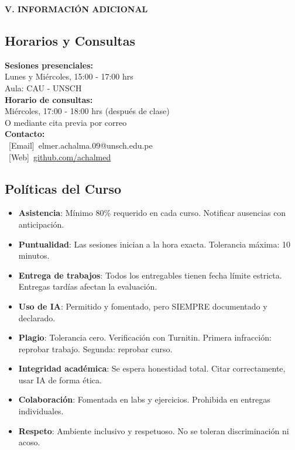 \documentclass[12pt,a4paper]{yaac-luatex}
\newcommand{\faInfoCircle}{\textbullet}
\newcommand{\faEnvelope}{[Email]}
\newcommand{\faGlobe}{[Web]}
\newcommand{\secciontitulo}[1]{
	\vspace{0.5cm}
	\begin{tcolorbox}[
		enhanced,
		colback=maincolor,
		colframe=maincolor,
		arc=3pt,
		boxrule=0pt,
		left=8pt,
		right=8pt,
		top=6pt,
		bottom=6pt
		]
		{\color{white}\large\bfseries #1}
	\end{tcolorbox}
}
\newcommand{\icontext}[2]{
	\mbox{%
		\textcolor{maincolor}{#1}\hspace{0.3em}%
		{#2}%
	}%
}
\begin{document}
	\secciontitulo{\faInfoCircle \hspace{0.3em} V. INFORMACIÓN ADICIONAL}
	
	\subsection*{Horarios y Consultas}
	
	\begin{tcolorbox}[
		enhanced,
		colback=lightgray,
		colframe=maincolor,
		arc=3pt,
		boxrule=1pt
		]
		\textbf{Sesiones presenciales:}\\
		Lunes y Miércoles, 15:00 - 17:00 hrs\\
		Aula: CAU - UNSCH\\[0.3cm]
		
		\textbf{Horario de consultas:}\\
		Miércoles, 17:00 - 18:00 hrs (después de clase)\\
		O mediante cita previa por correo\\[0.3cm]
		
		\textbf{Contacto:}\\
		\icontext{\faEnvelope}{elmer.achalma.09@unsch.edu.pe}\\
		\icontext{\faGlobe}{\href{https://github.com/achalmed}{github.com/achalmed}}
	\end{tcolorbox}
	
	\subsection*{Políticas del Curso}
	
	\begin{itemize}[leftmargin=*, itemsep=0.2cm]
		\item \textbf{Asistencia}: Mínimo 80\% requerido en cada curso. Notificar ausencias con anticipación.
		\item \textbf{Puntualidad}: Las sesiones inician a la hora exacta. Tolerancia máxima: 10 minutos.
		\item \textbf{Entrega de trabajos}: Todos los entregables tienen fecha límite estricta. Entregas tardías afectan la evaluación.
		\item \textbf{Uso de IA}: Permitido y fomentado, pero SIEMPRE documentado y declarado.
		\item \textbf{Plagio}: Tolerancia cero. Verificación con Turnitin. Primera infracción: reprobar trabajo. Segunda: reprobar curso.
		\item \textbf{Integridad académica}: Se espera honestidad total. Citar correctamente, usar IA de forma ética.
		\item \textbf{Colaboración}: Fomentada en labs y ejercicios. Prohibida en entregas individuales.
		\item \textbf{Respeto}: Ambiente inclusivo y respetuoso. No se toleran discriminación ni acoso.
	\end{itemize}
	
\end{document}
